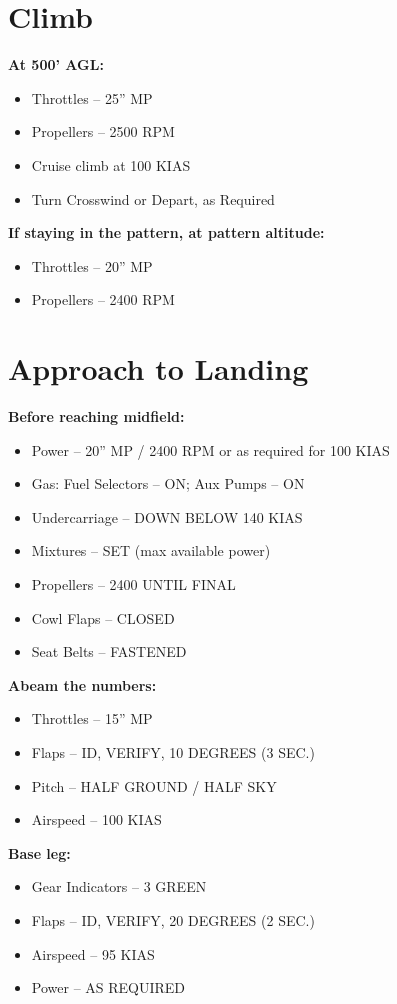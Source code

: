 {\section{Climb}
\textbf{At 500' AGL:}
\begin{itemize}[label={}]
\item Throttles – 25” MP
\item Propellers – 2500 RPM
\item Cruise climb at 100 KIAS
\item Turn Crosswind or Depart, as Required
\end{itemize}
\textbf{If staying in the pattern, at pattern altitude:}
\begin{itemize}[label={}]
\item Throttles – 20” MP
\item Propellers – 2400 RPM
\end{itemize}

\section{Approach to Landing}
\textbf{Before reaching midfield:}
\begin{itemize}[label={}]
\item Power – 20” MP / 2400 RPM or as required for 100 KIAS
\item Gas: Fuel Selectors – ON; Aux Pumps – ON
\item Undercarriage – DOWN BELOW 140 KIAS
\item Mixtures – SET (max available power)
\item Propellers – 2400 UNTIL FINAL
\item Cowl Flaps – CLOSED
\item Seat Belts – FASTENED
\end{itemize}

\textbf{Abeam the numbers:}
\begin{itemize}[label={}]
\item Throttles – 15” MP
\item Flaps – ID, VERIFY, 10 DEGREES (3 SEC.)
\item Pitch – HALF GROUND / HALF SKY
\item Airspeed – 100 KIAS
\end{itemize}

\textbf{Base leg:}
\begin{itemize}[label={}]
\item Gear Indicators – 3 GREEN
\item Flaps – ID, VERIFY, 20 DEGREES (2 SEC.)
\item Airspeed – 95 KIAS
\item Power – AS REQUIRED
\end{itemize}

}

